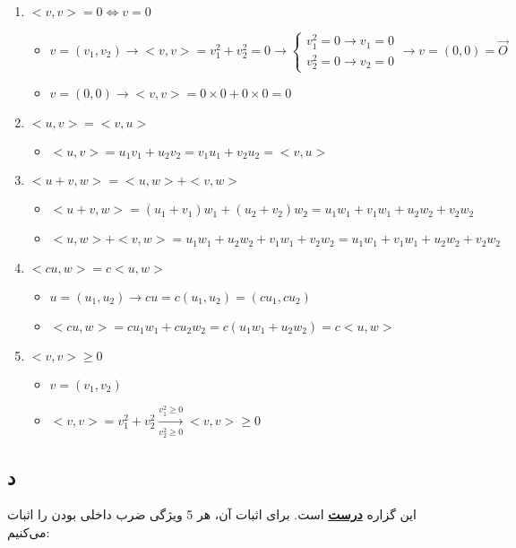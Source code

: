 \begin{enumerate}
	\item $<v,v>=0 \Longleftrightarrow v=0$
		\begin{itemize}
			\item $v=(v_{1},v_{2}) \rightarrow <v,v>=v_{1}^2+v_{2}^2=0\rightarrow \begin{cases}
				v_{1}^2=0 \rightarrow v_{1}=0 \\ v_{2}^2=0 \rightarrow v_{2}=0
			\end{cases}\longrightarrow v=(0,0)=\overrightarrow{O}$
			
			\item $v=(0,0)\rightarrow <v,v>=0\times0 + 0\times0 = 0$
		\end{itemize}
	\item $<u,v>=<v,u>$
		\begin{itemize}
			\item 	$<u,v>=u_{1}v_{1}+u_{2}v_{2}=v_{1}u_{1}+v_{2}u_{2}=<v,u>$
		\end{itemize}
	\item $<u+v,w>=<u,w>+<v,w>$
	\begin{itemize}
		\item $<u+v,w>=(u_{1}+v_{1})w_{1}+(u_{2}+v_{2})w_{2}=u_{1}w_{1}+v_{1}w_{1}+u_{2}w_{2}+v_{2}w_{2}$
		\item $<u,w>+<v,w>=u_{1}w_{1}+u_{2}w_{2}+v_{1}w_{1}+v_{2}w_{2}=u_{1}w_{1}+v_{1}w_{1}+u_{2}w_{2}+v_{2}w_{2}$
	\end{itemize}
	\item $<cu,w>=c<u,w>$
	\begin{itemize}
		\item $u=(u_1,u_2)\rightarrow cu=c(u_1,u_2)=(cu_1,cu_2)$
		\item $<cu,w>=cu_{1}w_{1}+cu_{2}w_{2}=c(u_{1}w_{1}+u_{2}w_{2})=c<u,w>$
	\end{itemize}
	\item $<v,v> \geq 0$
	\begin{itemize}
		\item $v=(v_1,v_2)$
		\item $<v,v>=v_1^2+v_2^2 \xrightarrow[v_{2}^2\geq0]{v_{1}^2\geq0}<v,v>\geq 0$
	\end{itemize}
\end{enumerate}

\setRTL
\pagebreak

\subsection*{د}
این گزاره \underline{\textbf{درست}} است.
برای اثبات آن، هر 5 ویژگی ضرب داخلی بودن را اثبات می‌کنیم:

